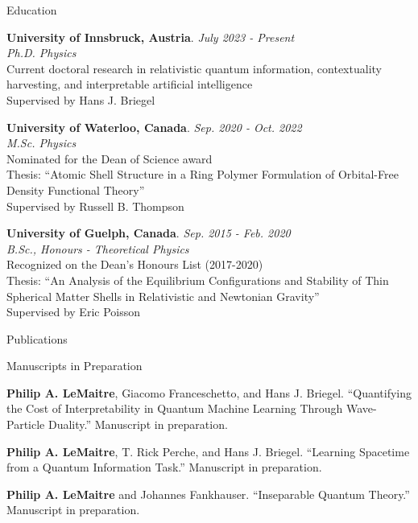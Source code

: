 \documentclass{resume} %
\begin{document}
\begin{rSection}{Education}

{\bf University of Innsbruck, Austria}.
\hfill {\em July 2023 - Present}
\\
\textit{Ph.D. Physics} \\
Current doctoral research in relativistic quantum information, contextuality harvesting, and interpretable artificial intelligence \\ Supervised by Hans J. Briegel

{\bf University of Waterloo, Canada}.
\hfill {\em Sep. 2020 - Oct. 2022}
\\
\textit{M.Sc. Physics} \\
Nominated for the Dean of Science award \\
Thesis: “Atomic Shell Structure in a Ring Polymer Formulation of Orbital-Free Density Functional Theory” \\ Supervised by Russell B. Thompson

{\bf University of Guelph, Canada}.
\hfill {\em Sep. 2015 - Feb. 2020}
\\
\textit{B.Sc., Honours - Theoretical Physics} \\
Recognized on the Dean's Honours List (2017-2020)\\
Thesis: ``An Analysis of the Equilibrium Configurations and Stability of Thin Spherical Matter Shells in Relativistic and Newtonian Gravity'' \\ Supervised by Eric Poisson

\end{rSection}

\vspace{1em}

\begin{rSection}{Publications}



\end{rSection}

\vspace{1em}

\begin{rSection}{Manuscripts in Preparation}

\noindent\textbf{Philip A. LeMaitre}, Giacomo Franceschetto, and Hans J. Briegel. ``Quantifying the Cost of Interpretability in Quantum Machine Learning Through Wave-Particle Duality.'' Manuscript in preparation.

\vspace{0.5em}

\noindent\textbf{Philip A. LeMaitre}, T. Rick Perche, and Hans J. Briegel. ``Learning Spacetime from a Quantum Information Task.'' Manuscript in preparation.

\vspace{0.5em}

\noindent\textbf{Philip A. LeMaitre} and Johannes Fankhauser. ``Inseparable Quantum Theory.'' Manuscript in preparation.

\end{rSection}
\end{document}
